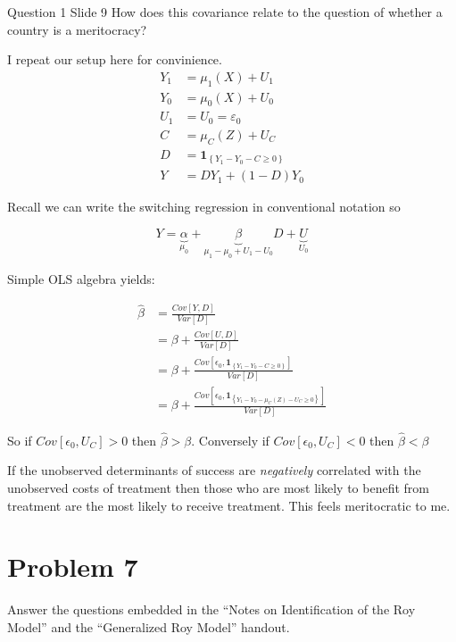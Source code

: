 \documentclass{article}
\begin{document}
\begin{problem}{Question 1 Slide 9} How does this covariance relate to the question of whether a country is a meritocracy?
\end{problem}
\begin{solution}

I repeat our setup here for convinience.
\begin{align*}
    Y_{1} &=\mu_{1}(X)+U_{1} \\ 
    Y_{0}&=\mu_{0}(X)+U_{0} \\
    U_{1}&=U_{0}=\varepsilon_{0} \\
    C &=\mu_{C}(Z)+U_{C} \\
    D&=\boldsymbol{1}_{\left\{Y_{1}-Y_{0}-C \geq 0\right\}} \\ 
    Y&=D Y_{1}+(1-D) Y_{0}
\end{align*}

Recall we can write the switching regression in conventional notation so 

$$
Y = \underbrace{\alpha}_{\mu_0} + \underbrace{\beta}_{\mu_1 - \mu_0 + U_1 - U_0} D + \underbrace{U}_{U_0}
$$

Simple OLS algebra yields:

\begin{align*}
\widehat{\beta} &= \frac{Cov[Y,D]}{Var[D]} \\
&= \beta + \frac{Cov[U,D]}{Var[D]} \\
&= \beta + \frac{Cov[\epsilon_0,\boldsymbol{1}_{\left\{Y_{1}-Y_{0}-C \geq 0\right\}}]}{Var[D]} \\
&= \beta + \frac{Cov[\epsilon_0,\boldsymbol{1}_{\left\{Y_{1}-Y_{0}-\mu_{C}(Z)-U_{C} \geq 0\right\}}]}{Var[D]}
\end{align*}

So if $Cov[\epsilon_0, U_C]>0$ then $\widehat{\beta} > \beta$. Conversely if $Cov[\epsilon_0, U_C]<0$ then $\widehat{\beta} < \beta$

If the unobserved determinants of success are \emph{negatively} correlated with the unobserved costs of treatment then those who are most likely to benefit from treatment are the most likely to receive treatment. This feels meritocratic to me.
\end{solution}


\newpage

\section*{Problem 7}
Answer the questions embedded in the ``Notes on Identification of the Roy Model'' and the ``Generalized Roy Model'' handout.
\end{document}
